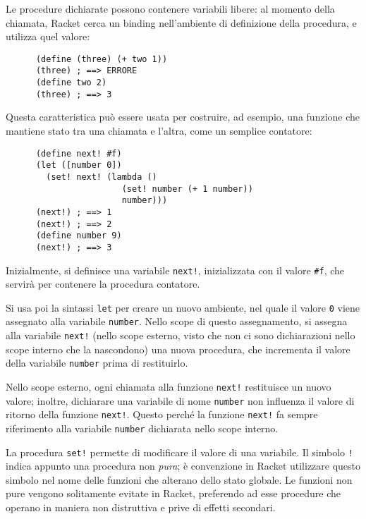 Le procedure dichiarate possono contenere variabili libere: al momento
della chiamata, Racket cerca un binding nell'ambiente di definizione
della procedura, e utilizza quel valore:

\begin{lstlisting}
      (define (three) (+ two 1))
      (three) ; ==> ERRORE
      (define two 2)
      (three) ; ==> 3
\end{lstlisting}

Questa caratteristica pu\`o essere usata per costruire, ad esempio, una
funzione che mantiene stato tra una chiamata e l'altra, come un semplice
contatore:

\begin{lstlisting}
      (define next! #f)
      (let ([number 0])
        (set! next! (lambda ()
                       (set! number (+ 1 number))
                       number)))
      (next!) ; ==> 1
      (next!) ; ==> 2
      (define number 9)
      (next!) ; ==> 3
\end{lstlisting}

Inizialmente, si definisce una variabile \lstinline{next!}, inizializzata
con il valore \lstinline{#f}, che servir\`a per contenere la procedura
contatore.

Si usa poi la sintassi \lstinline{let} per creare un nuovo ambiente,
nel quale il valore \lstinline{0} viene assegnato alla variabile
\lstinline{number}. Nello scope di questo assegnamento, si assegna
alla variabile \lstinline{next!} (nello scope esterno, visto che non ci
sono dichiarazioni nello scope interno che la nascondono) una nuova
procedura, che incrementa il valore della variabile \lstinline{number}
prima di restituirlo.

Nello scope esterno, ogni chiamata alla funzione \lstinline{next!}
restituisce un nuovo valore; inoltre, dichiarare una variabile di nome
\lstinline{number} non influenza il valore di ritorno della
funzione \lstinline{next!}. Questo perch\'e la funzione \lstinline{next!}
fa sempre riferimento alla variabile \lstinline{number} dichiarata
nello scope interno.

La procedura \lstinline{set!} permette di modificare il valore di una
variabile. Il simbolo \lstinline{!} indica appunto una procedura non
\emph{pura}; \`e convenzione in Racket utilizzare questo simbolo nel
nome delle funzioni che alterano dello stato globale. Le funzioni non
pure vengono solitamente evitate in Racket, preferendo ad esse procedure
che operano in maniera non distruttiva e prive di effetti secondari.

